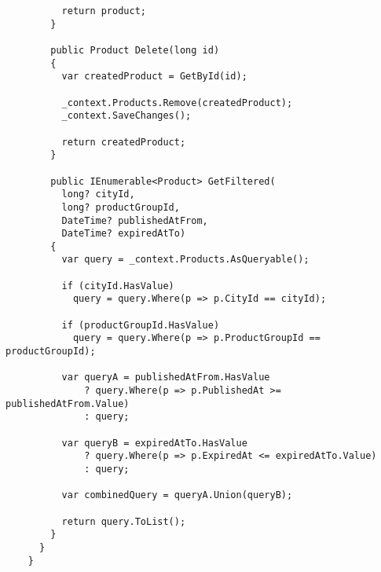 \begin{lstlisting}
          return product;
        }
    
        public Product Delete(long id)
        {
          var createdProduct = GetById(id);
    
          _context.Products.Remove(createdProduct);
          _context.SaveChanges();
    
          return createdProduct;
        }
    
        public IEnumerable<Product> GetFiltered(
          long? cityId, 
          long? productGroupId, 
          DateTime? publishedAtFrom, 
          DateTime? expiredAtTo)
        {
          var query = _context.Products.AsQueryable();
    
          if (cityId.HasValue)
            query = query.Where(p => p.CityId == cityId);
    
          if (productGroupId.HasValue)
            query = query.Where(p => p.ProductGroupId == productGroupId);
    
          var queryA = publishedAtFrom.HasValue
              ? query.Where(p => p.PublishedAt >= publishedAtFrom.Value)
              : query;
    
          var queryB = expiredAtTo.HasValue
              ? query.Where(p => p.ExpiredAt <= expiredAtTo.Value)
              : query;
    
          var combinedQuery = queryA.Union(queryB);
    
          return query.ToList();
        }
      }
    }
\end{lstlisting}

